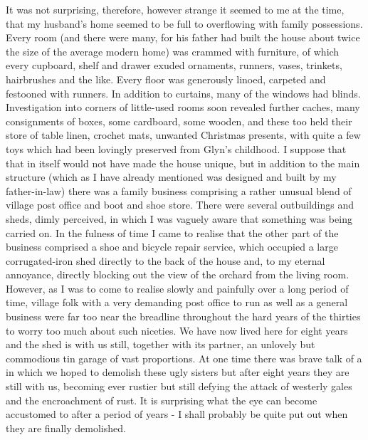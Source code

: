 It was not surprising, therefore, however strange it seemed to me at the time, that my husband's home seemed to be full to overflowing with family possessions. Every room (and there were many, for his father had built the house about twice the size of the average modern home) was crammed with furniture, of which every cupboard, shelf and drawer exuded ornaments, runners, vases, trinkets, hairbrushes and the like. Every floor was generously linoed, carpeted and festooned with runners. In addition to curtains, many of the windows had blinds. Investigation into corners of little-used rooms soon revealed further caches, many consignments of boxes, some cardboard, some wooden, and these too held their store of table linen, crochet mats, unwanted Christmas presents, with quite a few toys which had been lovingly preserved from Glyn's childhood. I suppose that that in itself would not have made the house unique, but in addition to the main structure (which as I have already mentioned was designed and built by my father-in-law) there was a family business comprising a rather unusual blend of village post office and boot and shoe store. There were several outbuildings and sheds, dimly perceived, in which I was vaguely aware that something was being carried on. In the fulness of time I came to realise that the other part of the business comprised a shoe and bicycle repair service, which occupied a large corrugated-iron shed directly to the back of the house and, to my eternal annoyance, directly blocking out the view of the orchard from the living room. However, as I was to come to realise slowly and painfully over a long period of time, village folk with a very demanding post office to run as well as a general business were far too near the breadline throughout the hard years of the thirties to worry too much about such niceties. We have now lived here for eight years and the shed is with us still, together with its partner, an unlovely but commodious tin garage of vast proportions. At one time there was brave talk of a  in which we hoped to demolish these ugly sisters but after eight years they are still with us, becoming ever rustier but still defying the attack of westerly gales and the encroachment of rust. It is surprising what the eye can become accustomed to after a period of years - I shall probably be quite put out when they are finally demolished.

